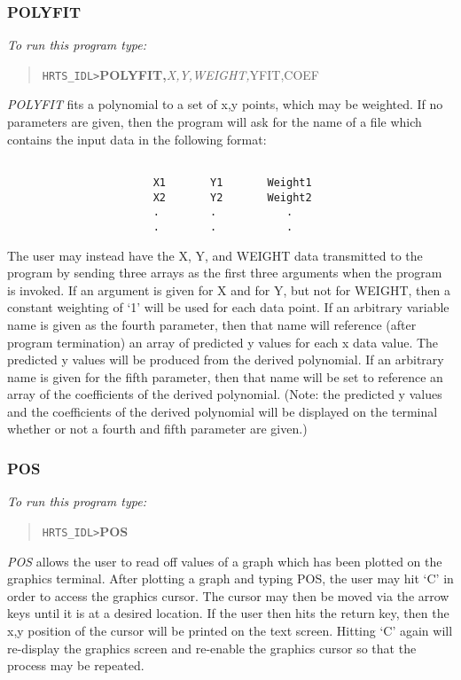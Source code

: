 \subsubsection{POLYFIT}

{\em To run this program type:}

\begin{quote}
    {\tt HRTS\_IDL>}{\bf POLYFIT,}{\it X,Y,WEIGHT,}YFIT,COEF
\end{quote}
{\em POLYFIT} fits a polynomial to a set of {x,y} points, which may be
weighted. If no parameters are given, then the program will ask for the name
of a file which contains the input data in the following format:
\begin{verbatim}

                       X1       Y1       Weight1
                       X2       Y2       Weight2
                       .        .           .
                       .        .           .

\end{verbatim}

The user may instead have the X, Y, and WEIGHT data transmitted to the program
by sending three arrays as the first three arguments when the program is
invoked.  If an argument is given for X and for Y, but not for WEIGHT, then a
constant weighting of `1' will be used for each data point.  If an arbitrary
variable name is given as the fourth parameter, then that name will reference
(after program termination) an array of predicted y values for each x data
value.  The predicted y values will be produced from the derived polynomial.
If an arbitrary name is given for the fifth parameter, then that name will be
set to reference an array of the coefficients of the derived polynomial. (Note:
the predicted y values and the coefficients of the derived polynomial will be
displayed on the terminal whether or not a fourth and fifth parameter are
given.)

\subsubsection{POS}

{\em To run this program type:}
\begin{quote}
      {\tt HRTS\_IDL>}{\bf POS}
\end{quote}

{\em POS} allows the user to read off values of a graph which has been plotted
on the graphics terminal.  After plotting a graph and typing POS, the user may
hit `C' in order to access the graphics cursor.  The cursor may then be moved
via the arrow keys until it is at a desired location. If the user then hits the
return key, then the {x,y} position of the cursor will be printed on the text
screen.  Hitting `C' again will re-display the graphics screen and re-enable
the graphics cursor so that the process may be repeated.

